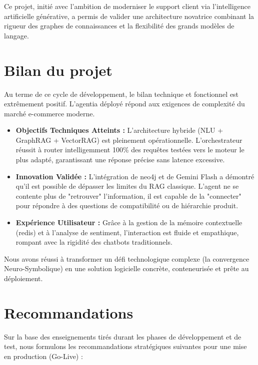 Ce projet, initié avec l'ambition de moderniser le support client via l'intelligence artificielle générative, a permis de valider une architecture novatrice combinant la rigueur des graphes de connaissances et la flexibilité des grands modèles de langage.

\section{Bilan du projet}

Au terme de ce cycle de développement, le bilan technique et fonctionnel est extrêmement positif. L'\gls{agentia} déployé répond aux exigences de complexité du marché e-commerce moderne.

\begin{itemize}
    \item \textbf{Objectifs Techniques Atteints :} L'architecture hybride (NLU + GraphRAG + VectorRAG) est pleinement opérationnelle. L'orchestrateur réussit à router intelligemment 100\% des requêtes testées vers le moteur le plus adapté, garantissant une réponse précise sans latence excessive.
    \item \textbf{Innovation Validée :} L'intégration de \gls{neo4j} et de Gemini Flash a démontré qu'il est possible de dépasser les limites du RAG classique. L'agent ne se contente plus de "retrouver" l'information, il est capable de la "connecter" pour répondre à des questions de compatibilité ou de hiérarchie produit.
    \item \textbf{Expérience Utilisateur :} Grâce à la gestion de la mémoire contextuelle (\gls{redis}) et à l'analyse de sentiment, l'interaction est fluide et empathique, rompant avec la rigidité des chatbots traditionnels.
\end{itemize}

Nous avons réussi à transformer un défi technologique complexe (la convergence Neuro-Symbolique) en une solution logicielle concrète, conteneurisée et prête au déploiement.

\section{Recommandations}

Sur la base des enseignements tirés durant les phases de développement et de test, nous formulons les recommandations stratégiques suivantes pour une mise en production (Go-Live) :

